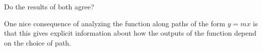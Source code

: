 \documentclass{ximera}
\begin{document}
\begin{exercise}
\begin{exercise}
\begin{exercise}
\begin{itemize}
Do the results of both agree?

One nice consequence of analyzing the function along paths of the form $y=mx$ is that this gives explicit information about how the outputs of the function depend on the choice of path.
\end{itemize}
\end{exercise}
\end{exercise}
 
\end{exercise}
\end{document}
